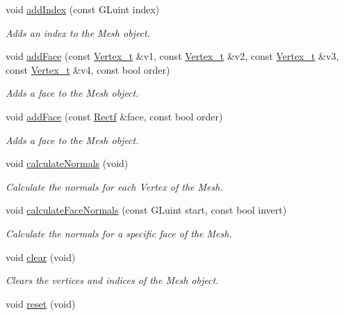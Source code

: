 \begin{DoxyCompactItemize}
void \hyperlink{classsparky_1_1_i_mesh_component_a2227cf2d530a083d2f7eee530022bf18}{add\+Index} (const G\+Luint index)
\begin{DoxyCompactList}\small\item\em Adds an index to the Mesh object. \end{DoxyCompactList}\item 
void \hyperlink{classsparky_1_1_i_mesh_component_a3b35df5332c7474b730036acfa71ab9e}{add\+Face} (const \hyperlink{structsparky_1_1_vertex__t}{Vertex\+\_\+t} \&v1, const \hyperlink{structsparky_1_1_vertex__t}{Vertex\+\_\+t} \&v2, const \hyperlink{structsparky_1_1_vertex__t}{Vertex\+\_\+t} \&v3, const \hyperlink{structsparky_1_1_vertex__t}{Vertex\+\_\+t} \&v4, const bool order)
\begin{DoxyCompactList}\small\item\em Adds a face to the Mesh object. \end{DoxyCompactList}\item 
void \hyperlink{classsparky_1_1_i_mesh_component_ae2d52735c4fbc11d7079a829a060ef33}{add\+Face} (const \hyperlink{classsparky_1_1_rect}{Rectf} \&face, const bool order)
\begin{DoxyCompactList}\small\item\em Adds a face to the Mesh object. \end{DoxyCompactList}\item 
void \hyperlink{classsparky_1_1_i_mesh_component_a7f2f75000f1535b31a0fd574ae2cd69d}{calculate\+Normals} (void)
\begin{DoxyCompactList}\small\item\em Calculate the normals for each Vertex of the Mesh. \end{DoxyCompactList}\item 
void \hyperlink{classsparky_1_1_i_mesh_component_ae1f65926ef4ed3c14507c47cdf57c8c8}{calculate\+Face\+Normals} (const G\+Luint start, const bool invert)
\begin{DoxyCompactList}\small\item\em Calculate the normals for a specific face of the Mesh. \end{DoxyCompactList}\item 
void \hyperlink{classsparky_1_1_i_mesh_component_a05c60457d7db9cc1b113423902143cfd}{clear} (void)\hypertarget{classsparky_1_1_i_mesh_component_a05c60457d7db9cc1b113423902143cfd}{}\label{classsparky_1_1_i_mesh_component_a05c60457d7db9cc1b113423902143cfd}

\begin{DoxyCompactList}\small\item\em Clears the vertices and indices of the Mesh object. \end{DoxyCompactList}\item 
void \hyperlink{classsparky_1_1_i_mesh_component_a0c34fef87ab29389bdf477a2801a4740}{reset} (void)\hypertarget{classsparky_1_1_i_mesh_component_a0c34fef87ab29389bdf477a2801a4740}{}\label{classsparky_1_1_i_mesh_component_a0c34fef87ab29389bdf477a2801a4740}


\end{DoxyCompactItemize}
